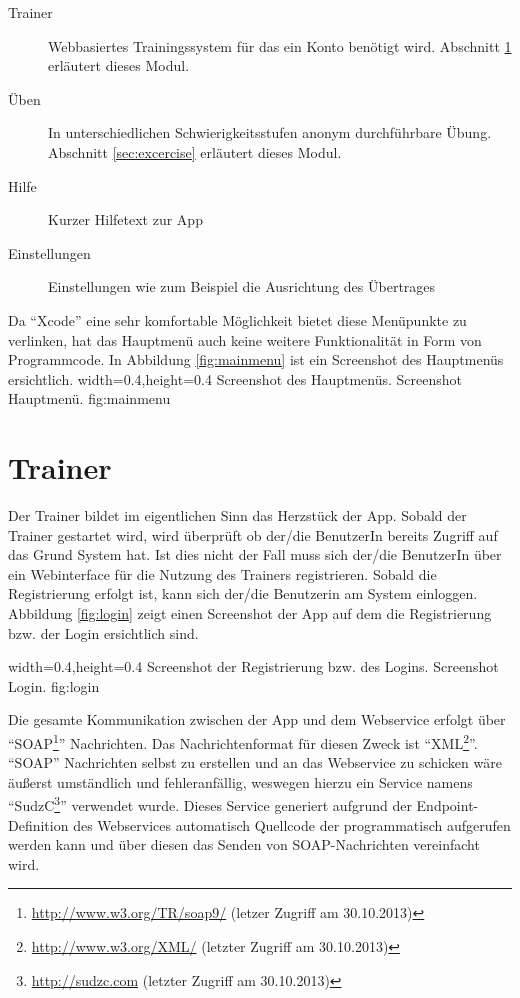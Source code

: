 \begin{description}
	\item[Trainer] Webbasiertes Trainingssystem für das ein Konto benötigt wird. Abschnitt \ref{subsec:trainer} erläutert dieses Modul. 
	\item[Üben] In unterschiedlichen Schwierigkeitsstufen anonym durchführbare Übung. Abschnitt \ref{sec:excercise} erläutert dieses Modul.
	\item[Hilfe] Kurzer Hilfetext zur App
	\item[Einstellungen] Einstellungen wie zum Beispiel die Ausrichtung des Übertrages	
\end{description}

Da \enquote{Xcode} eine sehr komfortable Möglichkeit bietet diese Menüpunkte
zu verlinken, hat das Hauptmenü auch keine weitere Funktionalität in Form von Programmcode. 
In Abbildung \ref{fig:mainmenu} ist ein Screenshot des Hauptmenüs ersichtlich. 
  {width=0.4\textwidth,height=0.4\textheight}%
  {Screenshot des Hauptmenüs.}%
  {Screenshot Hauptmenü.}%
  {fig:mainmenu}%

\section{Trainer}
\label{subsec:trainer}
Der Trainer bildet im eigentlichen Sinn das Herzstück der App. Sobald der Trainer gestartet wird, 
wird überprüft ob der/die BenutzerIn bereits Zugriff auf das Grund System hat. Ist dies nicht der Fall
muss sich der/die BenutzerIn über ein Webinterface für die Nutzung des Trainers registrieren. Sobald
die Registrierung erfolgt ist, kann sich der/die Benutzerin am System einloggen. Abbildung \ref{fig:login}
zeigt einen Screenshot der App auf dem die Registrierung bzw. der Login ersichtlich sind.

  {width=0.4\textwidth,height=0.4\textheight}%
  {Screenshot der Registrierung bzw. des Logins.}%
  {Screenshot Login.}%
  {fig:login}%
  
Die gesamte Kommunikation zwischen der App und dem Webservice erfolgt über \enquote{SOAP\footnote{\url{http://www.w3.org/TR/soap9/} (letzer Zugriff am 30.10.2013)}} Nachrichten.
Das Nachrichtenformat für diesen Zweck ist \enquote{XML\footnote{\url{http://www.w3.org/XML/} (letzter Zugriff am 30.10.2013)}}. \enquote{SOAP} Nachrichten
selbst zu erstellen und an das Webservice zu schicken wäre äußerst umständlich und fehleranfällig, weswegen
hierzu ein Service namens \enquote{SudzC\footnote{\url{http://sudzc.com} (letzter Zugriff am 30.10.2013)}} verwendet wurde. 
Dieses Service generiert aufgrund der Endpoint-Definition des Webservices automatisch Quellcode der 
programmatisch aufgerufen werden kann und über diesen das Senden von SOAP-Nachrichten 
vereinfacht wird.

